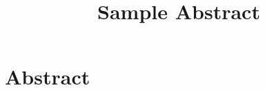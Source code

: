 \documentclass{article}
\title{Sample Abstract}
\author{}
\date{}
\begin{document}
	
	\maketitle
	
	\section*{Abstract}
	\lipsum[1]
	
	\vspace{0.5cm}
	
    \lipsum[3]
	
\end{document}
